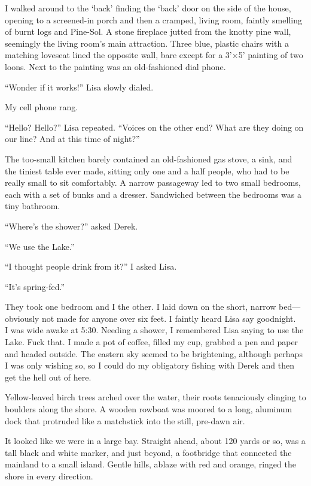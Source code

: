 I walked around to the `back' finding the `back' door on the side of the
house, opening to a screened-in porch and then a cramped, living room,
faintly smelling of burnt logs and Pine-Sol. A stone fireplace jutted
from the knotty pine wall, seemingly the living room's main attraction.
Three blue, plastic chairs with a matching loveseat lined the opposite
wall, bare except for a 3'×5' painting of two loons. Next to the
painting was an old-fashioned dial phone.

``Wonder if it works!'' Lisa slowly dialed.

My cell phone rang.

``Hello? Hello?'' Lisa repeated. ``Voices on the other end? What are
they doing on our line? And at this time of night?''

The too-small kitchen barely contained an old-fashioned gas stove, a
sink, and the tiniest table ever made, sitting only one and a half
people, who had to be really small to sit comfortably. A narrow
passageway led to two small bedrooms, each with a set of bunks and a
dresser. Sandwiched between the bedrooms was a tiny bathroom.

``Where's the shower?'' asked Derek.

``We use the Lake.''

``I thought people drink from it?'' I asked Lisa.

``It's spring-fed.''

They took one bedroom and I the other. I laid down on the short, narrow
bed---obviously not made for anyone over six feet. I faintly heard Lisa
say goodnight.\\

I was wide awake at 5:30. Needing a shower, I remembered Lisa saying to
use the Lake. Fuck that. I made a pot of coffee, filled my cup, grabbed
a pen and paper and headed outside. The eastern sky seemed to be
brightening, although perhaps I was only wishing so, so I could do my
obligatory fishing with Derek and then get the hell out of here.

Yellow-leaved birch trees arched over the water, their roots tenaciously
clinging to boulders along the shore. A wooden rowboat was moored to a
long, aluminum dock that protruded like a matchstick into the still,
pre-dawn air.

It looked like we were in a large bay. Straight ahead, about 120 yards
or so, was a tall black and white marker, and just beyond, a footbridge
that connected the mainland to a small island. Gentle hills, ablaze with
red and orange, ringed the shore in every direction.

